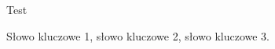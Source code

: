 \cleardoublepage{}

\abstract{}

Test

\keywords{}

Słowo kluczowe 1, słowo kluczowe 2, słowo kluczowe 3.
